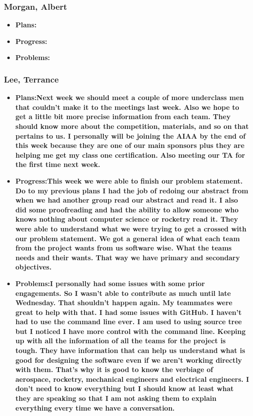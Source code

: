 \documentclass[10pt,draftclsnofoot,onecolumn]{IEEEtran}
\begin{document}
\subsubsection{Morgan, Albert}
\begin{itemize}
	\item \textbf{Plans:}
	\item \textbf{Progress:}
	\item \textbf{Problems:}
\end{itemize}
\subsubsection{Lee, Terrance}
\begin{itemize}
	\item \textbf{Plans:Next week we should meet a couple of more underclass men that couldn't make it to the meetings last week. Also we hope to get a little bit more precise information from each team. They should know more about the competition, materials, and so on that pertains to us. I personally will be joining the AIAA by the end of this week because they are one of our main sponsors plus they are helping me get my class one certification. Also meeting our TA for the first time next week.}
	\item \textbf{Progress:This week we were able to finish our problem statement. Do to my previous plans I had the job of redoing our abstract from when we had another group read our abstract and read it. I also did some proofreading and had the ability to allow someone who knows nothing about computer science or rocketry read it. They were able to understand what we were trying to get a crossed with our problem statement. We got a general idea of what each team from the project wants from us software wise. What the teams needs and their wants. That way we have primary and secondary objectives.}
	\item \textbf{Problems:I personally had some issues with some prior engagements. So I wasn't able to contribute as much until late Wednesday. That shouldn't happen again. My teammates were great to help with that. I had some issues with GitHub. I haven't had to use the command line ever. I am used to using source tree but I noticed I have more control with the command line. Keeping up with all the information of all the teams for the project is tough. They have information that can help us understand what is good for designing the software even if we aren't working directly with them. That's why it is good to know the verbiage of aerospace, rocketry, mechanical engineers and electrical engineers. I don't need to know everything but I should know at least what they are speaking so that I am not asking them to explain everything every time we have a conversation.}
\end{itemize}
\end{document}
